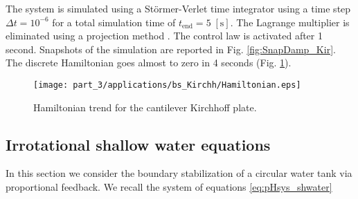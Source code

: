 The system is simulated using a St\"ormer-Verlet time integrator \cite{hairer2003geometric} using a time step $\Delta t = 10^{-6}$ for a total simulation time of $t_{\text{end}} = 5 \; \mathrm{[s]}$. The Lagrange multiplier is eliminated using a projection method \cite{benner2015time}. The control law is activated after 1 second. Snapshots of the simulation are reported in Fig. \ref{fig:SnapDamp_Kir}. The discrete Hamiltonian goes almost to zero in 4 seconds (Fig. \ref{fig:H_bs_Kirchhoff}).


\begin{figure}[htb]
	\centering
	\texttt{[image: part\_3/applications/bs\_Kirchh/Hamiltonian.eps]}
	\caption{Hamiltonian trend for the cantilever Kirchhoff plate.}
	\label{fig:H_bs_Kirchhoff}
\end{figure}

\begin{figure*}[p]
	\centering
	\hfil
	\hfil
	\hfil
	\hfil
	\caption{Snapshots at different times of the simulation of the boundary controlled cantilever Kirchhoff plate.}
	\label{fig:SnapDamp_Kir}
	\hfil
\end{figure*}



\subsection{Irrotational shallow water equations}
In this section we consider the boundary stabilization of a circular water tank via proportional feedback. We recall the system of equations \eqref{eq:pHsys_shwater}

